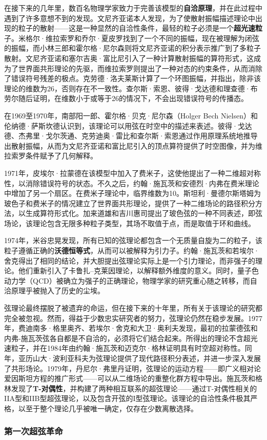在接下来的几年里，数百名物理学家致力于完善该模型的\textbf{自洽原理}，并在此过程中遇到了许多意想不到的发现。文尼齐亚诺本人发现，为了使散射振幅描述理论中出现的粒子的散射——这是一种显然的自洽性条件，最轻的粒子必须是一个\textbf{超光速粒}子。米格尔·维拉索罗和乔尔·夏皮罗找到了一个不同的振幅，现在被理解为闭弦的振幅，而小林三郎和霍尔格·尼尔森则将文尼齐亚诺的积分表示推广到了多粒子散射。文尼齐亚诺和塞尔吉奥·富比尼引入了一种计算散射振幅的算符形式，这成为了世界面共形理论的先驱，而维拉索罗则提出了一种对态的约束条件，从而消除了错误符号残差的极点。克劳德·洛夫莱斯计算了一个环图振幅，并指出，除非该理论的维数为26，否则存在不一致性。查尔斯·索恩、彼得·戈达德和理查德·布劳尔随后证明，在维数小于或等于26的情况下，不会出现错误符号的传播态。

在1969至1970年，南部阳一郎、霍尔格·贝克·尼尔森（Holger Bech Nielsen）和伦纳德·萨斯坎德认识到，该理论可以用弦在时空中的描述来表述。彼得·戈达德、杰弗里·戈尔茨通、克劳迪奥·雷比和查尔斯·索恩通过作用原理系统地推导出散射振幅，从而为文尼齐亚诺和富比尼引入的顶点算符提供了时空图像，并为维拉索罗条件赋予了几何解释。

1971年，皮埃尔·拉蒙德在该模型中加入了费米子，这使他提出了一种二维超对称性，以消除错误符号的状态。不久之后，约翰·施瓦茨和安德烈·内弗在费米理论中增加了另一个扇区。在费米子理论中，临界维数为10。斯坦利·曼德尔斯塔姆为玻色子和费米子的情况建立了世界面共形理论，提供了一种二维场论的路径积分方法，以生成算符形式化。加来道雄和吉川惠司提出了玻色弦的一种不同表述，即弦场论，该理论包含无限多种粒子类型，其场不取值于点，而是取值于环和曲线。

1974年，米谷忠晃发现，所有已知的弦理论都包含一个无质量自旋为二的粒子，该粒子遵循正确的\textbf{沃德恒等式}，从而可以被解释为引力子。约翰·施瓦茨和若埃尔·舍克得出了相同的结论，并大胆提出弦理论实际上是一个引力理论，而非强子的理论。他们重新引入了卡鲁扎–克莱因理论，以解释额外维度的意义。同时，量子色动力学（QCD）被确立为强子的正确理论，物理学家的研究重心随之转移，而自洽原理乎被抛入了历史的尘埃。

弦理论最终摆脱了被遗弃的命运，但在接下来的十年里，所有关于该理论的研究都完全被忽视。然而，得益于少数忠实研究者的努力，弦理论仍然在稳步发展。1977年，费迪南多·格里奥齐、若埃尔·舍克和大卫·奥利夫发现，最初的拉蒙德弦和内弗-施瓦茨弦各自都是不自洽的，必须将它们结合起来。所得出的理论不含超光速粒子，并在1984年由约翰·施瓦茨和迈克尔·格林证明具有时空超对称性。同年，亚历山大·波利亚科夫为弦理论提供了现代路径积分表述，并进一步深入发展了共形场论。1979年，丹尼尔·弗里丹证明，弦理论的运动方程——即广义相对论爱因斯坦方程的推广形式——可以从二维场论的重整化群方程中导出。施瓦茨和格林发现了\textbf{T-对偶性}，并构建了两种相互联系的超弦理论——通过T-对偶性相关的IIA型和IIB型超弦理论，以及包含开弦的I型弦理论。该理论的自洽性条件极其严格，以至于整个理论几乎被唯一确定，仅存在少数离散选择。
\subsubsection{第一次超弦革命}
